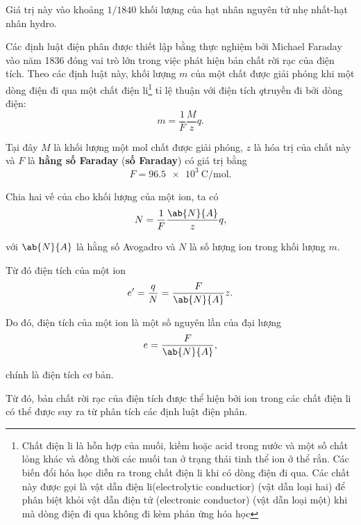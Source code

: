 \noindent
Giá trị này vào khoảng $1/1840$ khối lượng của hạt nhân nguyên tử nhẹ nhất-hạt nhân hydro.

Các định luật điện phân được thiết lập bằng thực nghiệm bởi Michael Faraday vào năm 1836 đóng vai trò lớn trong việc phát hiện bản chất rời rạc của điện tích.
Theo các định luật này, khối lượng $m$ của một chất
được giải phóng khi một dòng điện đi qua một chất điện li\footnote{Chất điện li là hỗn hợp của muối, kiềm hoặc acid trong nước và một số chất lỏng khác và đồng thời các muối tan ở trạng thái tinh thể ion ở thể rắn. Các biến đổi hóa học diễn ra trong chất điện li khi có dòng điện đi qua. Các chất này được gọi là vật dẫn điện li(electrolytic conductior) (vật dẫn loại hai) để phân biệt khỏi vật dẫn điện tử (electronic conductor) (vật dẫn loại một) khi mà dòng điện đi qua không đi kèm phản ứng hóa học} tỉ lệ thuận với điện tích $q$truyền đi bởi dòng điện:
\begin{equation}\label{eq:10_25}
    m = \frac{1}{F} \frac{M}{z} q.
\end{equation}

\noindent
Tại đây $M$ là khối lượng một mol chất được giải phóng, $z$ là hóa trị của chất này và $F$ là \textbf{hằng số Faraday} (\textbf{số Faraday}) có giá trị bằng
\begin{equation}\label{eq:10_26}
    F = \SI{96.5e3}{\coulomb\per\mole}.
\end{equation}

Chia hai vế của  cho khối lượng của một ion, ta có
\begin{equation*}
    N = \frac{1}{F} \frac{\ab{N}{A}}{z} q,
\end{equation*}

\noindent
với $\ab{N}{A}$ là hằng số Avogadro và $N$ là số lượng ion trong khối lượng $m$.

Từ đó điện tích của một ion
\begin{equation*}
    e' = \frac{q}{N} = \frac{F}{\ab{N}{A}} z.
\end{equation*}

\noindent
Do đó, điện tích của một ion là một số nguyên lần của đại lượng
\begin{equation}\label{eq:10_27}
    e = \frac{F}{\ab{N}{A}},
\end{equation}

\noindent
chính là điện tích cơ bản.

Từ đó, bản chất rời rạc của điện tích được thể hiện bởi ion trong các chất điện li có thể được suy ra từ phân tích các định luật điện phân.

